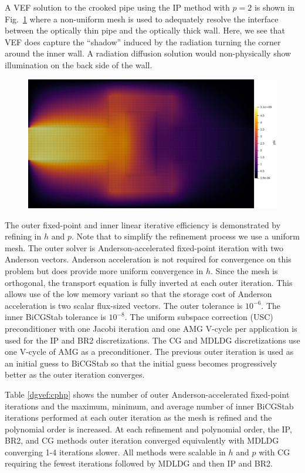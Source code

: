 \documentclass[../doc.tex]{subfiles}
\begin{document}
A VEF solution to the crooked pipe using the IP method with $p=2$ is shown in Fig.~\ref{dgvef:cp_sol} where a non-uniform mesh is used to adequately resolve the interface between the optically thin pipe and the optically thick wall. Here, we see that VEF does capture the ``shadow'' induced by the radiation turning the corner around the inner wall. A radiation diffusion solution would non-physically show illumination on the back side of the wall.
\begin{figure}
\centering
\includegraphics[width=.65\textwidth]{data/img/cp.png}
\caption{}
\label{dgvef:cp_sol}
\end{figure}

The outer fixed-point and inner linear iterative efficiency is demonstrated by refining in $h$ and $p$. Note that to simplify the refinement process we use a uniform mesh. The outer solver is Anderson-accelerated fixed-point iteration with two Anderson vectors. Anderson acceleration is not required for convergence on this problem but does provide more uniform convergence in $h$. Since the mesh is orthogonal, the transport equation is fully inverted at each outer iteration. This allows use of the low memory variant so that the storage cost of Anderson acceleration is two scalar flux-sized vectors. The outer tolerance is $10^{-6}$. The inner BiCGStab tolerance is $10^{-8}$. The uniform subspace correction (USC) preconditioner with one Jacobi iteration and one AMG V-cycle per application is used for the IP and BR2 discretizations. The CG and MDLDG discretizations use one V-cycle of AMG as a preconditioner. The previous outer iteration is used as an initial guess to BiCGStab so that the initial guess becomes progressively better as the outer iteration converges. 

Table \ref{dgvef:cphp} shows the number of outer Anderson-accelerated fixed-point iterations and the maximum, minimum, and average number of inner BiCGStab iterations performed at each outer iteration as the mesh is refined and the polynomial order is increased. At each refinement and polynomial order, the IP, BR2, and CG methods outer iteration converged equivalently with MDLDG converging 1-4 iterations slower. All methods were scalable in $h$ and $p$ with CG requiring the fewest iterations followed by MDLDG and then IP and BR2. 
\begin{table}
\centering
\caption{}
\label{dgvef:cphp}
\begin{adjustbox}{max width = \textwidth}

\end{adjustbox}
\end{table}
\end{document}
